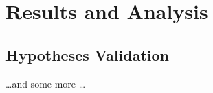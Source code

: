 
\chapter{Results and Analysis}  %

\ifpdf
    \graphicspath{{Chapter1/Figs/Raster/}{Chapter1/Figs/PDF/}{Chapter1/Figs/}{/Users/luyolomagangane/Documents/Academics/Images/Recursive-Neural-Tensor-Networks/}}
\else
    \graphicspath{{Chapter1/Figs/Vector/}{Chapter1/Figs/}}
\fi


\section{Hypotheses Validation}
\dots and some more \dots
